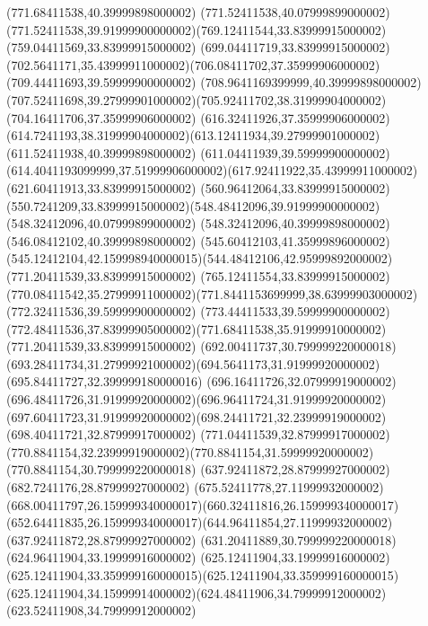 {{	\lineto(771.68411538,40.39999898000002)
	\lineto(771.52411538,40.07999899000002)
	\curveto(771.52411538,39.91999900000002)(769.12411544,33.83999915000002)(759.04411569,33.83999915000002)
	\lineto(699.04411719,33.83999915000002)
	\curveto(702.5641171,35.43999911000002)(706.08411702,37.35999906000002)(709.44411693,39.59999900000002)
	\lineto(708.9641169399999,40.39999898000002)
	\curveto(707.52411698,39.27999901000002)(705.92411702,38.31999904000002)(704.16411706,37.35999906000002)
	\lineto(616.32411926,37.35999906000002)
	\curveto(614.7241193,38.31999904000002)(613.12411934,39.27999901000002)(611.52411938,40.39999898000002)
	\lineto(611.04411939,39.59999900000002)
	\curveto(614.4041193099999,37.51999906000002)(617.92411922,35.43999911000002)(621.60411913,33.83999915000002)
	\lineto(560.96412064,33.83999915000002)
	\curveto(550.7241209,33.83999915000002)(548.48412096,39.91999900000002)(548.32412096,40.07999899000002)
	\lineto(548.32412096,40.39999898000002)
	\lineto(546.08412102,40.39999898000002)
	\curveto(545.60412103,41.35999896000002)(545.12412104,42.159998940000015)(544.48412106,42.95999892000002)
	\closepath
	\moveto(771.20411539,33.83999915000002)
	\lineto(765.12411554,33.83999915000002)
	\curveto(770.08411542,35.27999911000002)(771.8441153699999,38.63999903000002)(772.32411536,39.59999900000002)
	\lineto(773.44411533,39.59999900000002)
	\curveto(772.48411536,37.83999905000002)(771.68411538,35.91999910000002)(771.20411539,33.83999915000002)
	\closepath
	\moveto(692.00411737,30.799999220000018)
	\curveto(693.28411734,31.27999921000002)(694.5641173,31.91999920000002)(695.84411727,32.399999180000016)
	\curveto(696.16411726,32.07999919000002)(696.48411726,31.91999920000002)(696.96411724,31.91999920000002)
	\curveto(697.60411723,31.91999920000002)(698.24411721,32.23999919000002)(698.40411721,32.87999917000002)
	\lineto(771.04411539,32.87999917000002)
	\curveto(770.8841154,32.23999919000002)(770.8841154,31.59999920000002)(770.8841154,30.799999220000018)
	\closepath
	\moveto(637.92411872,28.87999927000002)
	\lineto(682.7241176,28.87999927000002)
	\curveto(675.52411778,27.11999932000002)(668.00411797,26.159999340000017)(660.32411816,26.159999340000017)
	\curveto(652.64411835,26.159999340000017)(644.96411854,27.11999932000002)(637.92411872,28.87999927000002)
	\closepath
	\moveto(631.20411889,30.799999220000018)
	\lineto(624.96411904,33.19999916000002)
	\curveto(625.12411904,33.19999916000002)(625.12411904,33.359999160000015)(625.12411904,33.359999160000015)
	\curveto(625.12411904,34.15999914000002)(624.48411906,34.79999912000002)(623.52411908,34.79999912000002)
}}

